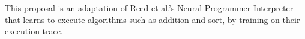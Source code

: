 This proposal is an adaptation of Reed et al.'s Neural Programmer-Interpreter \cite{reed2015neural} that learns to execute algorithms such as addition and sort, by training on their execution trace.

